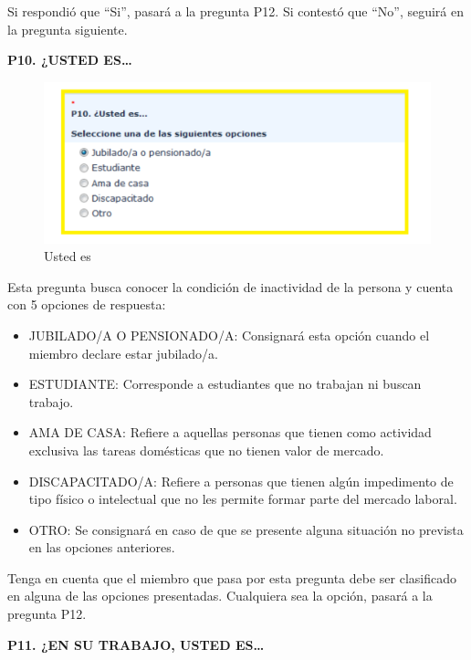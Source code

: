 \documentclass[
  openany]{book}
\begin{document}
Si respondió que ``Si'', pasará a la pregunta P12. Si contestó que ``No'', seguirá en la pregunta siguiente.

\textbf{P10. ¿USTED ES\ldots{}}

\begin{figure}

{\centering \includegraphics[width=1\linewidth]{imagenes/figura6-57} 

}

\caption{Usted es}\label{fig:ustedes}
\end{figure}

Esta pregunta busca conocer la condición de inactividad de la persona y cuenta con 5 opciones de respuesta:

\begin{itemize}
\item
  JUBILADO/A O PENSIONADO/A: Consignará esta opción cuando el miembro declare estar jubilado/a.
\item
  ESTUDIANTE: Corresponde a estudiantes que no trabajan ni buscan trabajo.
\item
  AMA DE CASA: Refiere a aquellas personas que tienen como actividad exclusiva las tareas domésticas que no tienen valor de mercado.
\item
  DISCAPACITADO/A: Refiere a personas que tienen algún impedimento de tipo físico o intelectual que no les permite formar parte del mercado laboral.
\item
  OTRO: Se consignará en caso de que se presente alguna situación no prevista en las opciones anteriores.
\end{itemize}

Tenga en cuenta que el miembro que pasa por esta pregunta debe ser clasificado en alguna de las opciones presentadas. Cualquiera sea la opción, pasará a la pregunta P12.

\textbf{P11. ¿EN SU TRABAJO, USTED ES\ldots{}}
\end{document}
